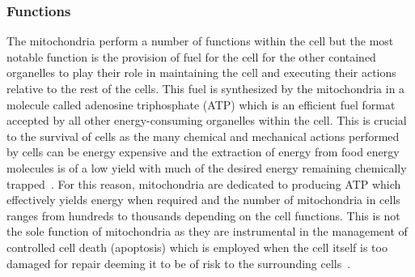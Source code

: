 \subsubsection*{Functions}
The mitochondria perform a number of functions within the cell but the most notable function is the provision of fuel for the cell for the other contained organelles to play their role in maintaining the cell and executing their actions relative to the rest of the cells. This fuel is synthesized by the mitochondria in a molecule called adenosine triphosphate (ATP) which is an efficient fuel format accepted by all other energy-consuming organelles within the cell. This is crucial to the survival of cells as the many chemical and mechanical actions performed by cells can be energy expensive and the extraction of energy from food energy molecules is of a low yield with much of the desired energy remaining chemically trapped~\cite[p. 33, 35, 40]{cell_phys_book}. For this reason, mitochondria are dedicated to producing ATP which effectively yields energy when required and the number of mitochondria in cells ranges from hundreds to thousands depending on the cell functions. This is not the sole function of mitochondria as they are instrumental in the management of controlled cell death (apoptosis) which is employed when the cell itself is too damaged for repair deeming it to be of risk to the surrounding cells~\cite[p. 40-41]{cell_phys_book}.
